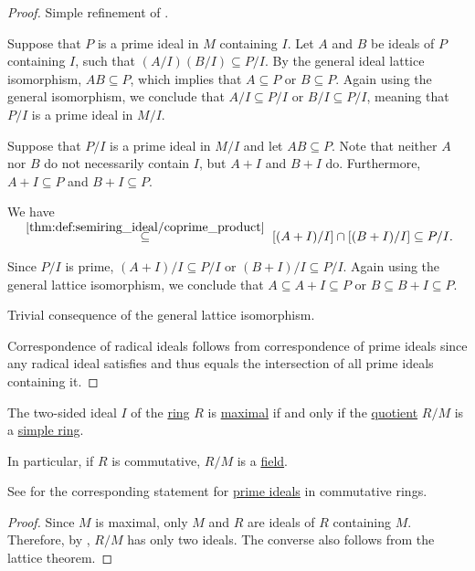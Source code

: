 \begin{proof}
   Simple refinement of .

  \SufficiencySubProof* Suppose that \( P \) is a prime ideal in \( M \) containing \( I \). Let \( A \) and \( B \) be ideals of \( P \) containing \( I \), such that \( (A / I) (B / I) \subseteq P / I \). By the general ideal lattice isomorphism, \( AB \subseteq P \), which implies that \( A \subseteq P \) or \( B \subseteq P \). Again using the general isomorphism, we conclude that \( A / I \subseteq P / I \) or \( B / I \subseteq P / I \), meaning that \( P / I \) is a prime ideal in \( M / I \).

  \NecessitySubProof* Suppose that \( P / I \) is a prime ideal in \( M / I \) and let \( AB \subseteq P \). Note that neither \( A \) nor \( B \) do not necessarily contain \( I \), but \( A + I \) and \( B + I \) do. Furthermore, \( A + I \subseteq P \) and \( B + I \subseteq P \).

  We have
  \begin{equation*}
    [(A + I) / I][(B + I) / I]
    \reloset {\ref{thm:def:semiring_ideal/coprime_product}} \subseteq
    [(A + I) / I] \cap [(B + I) / I]
    \subseteq
    P / I.
  \end{equation*}

  Since \( P / I \) is prime, \( (A + I) / I \subseteq P / I \) or \( (B + I) / I \subseteq P / I \). Again using the general lattice isomorphism, we conclude that \( A \subseteq A + I \subseteq P \) or \( B \subseteq B + I \subseteq P \).

   Trivial consequence of the general lattice isomorphism.

   Correspondence of radical ideals follows from correspondence of prime ideals since any radical ideal satisfies  and thus equals the intersection of all prime ideals containing it.
\end{proof}

\begin{corollary}\label{thm:quotient_by_maximal_ideal}
  The two-sided ideal \( I \) of the \hyperref[def:ring]{ring} \( R \) is \hyperref[def:semiring_ideal/maximal]{maximal} if and only if the \hyperref[def:ring/quotient]{quotient} \( R / M \) is a \hyperref[def:ring/simple]{simple ring}.

  In particular, if \( R \) is commutative, \( R / M \) is a \hyperref[def:field]{field}.

  See  for the corresponding statement for \hyperref[def:semiring_ideal/prime]{prime ideals} in commutative rings.
\end{corollary}
\begin{proof}
  Since \( M \) is maximal, only \( M \) and \( R \) are ideals of \( R \) containing \( M \). Therefore, by , \( R / M \) has only two ideals. The converse also follows from the lattice theorem.
\end{proof}

